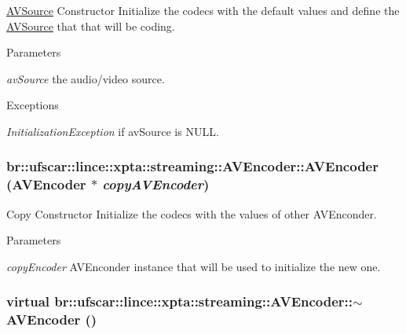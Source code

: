 \hyperlink{classbr_1_1ufscar_1_1lince_1_1xpta_1_1streaming_1_1AVSource}{AVSource} Constructor Initialize the codecs with the default values and define the \hyperlink{classbr_1_1ufscar_1_1lince_1_1xpta_1_1streaming_1_1AVSource}{AVSource} that that will be coding. 


\begin{DoxyParams}{Parameters}
\item[{\em avSource}]the audio/video source. \end{DoxyParams}

\begin{DoxyExceptions}{Exceptions}
\item[{\em InitializationException}]if avSource is NULL. \end{DoxyExceptions}
\hypertarget{classbr_1_1ufscar_1_1lince_1_1xpta_1_1streaming_1_1AVEncoder_a7d4521d46902758f1354421233c45678}{
\subsubsection[{AVEncoder}]{\setlength{\rightskip}{0pt plus 5cm}br::ufscar::lince::xpta::streaming::AVEncoder::AVEncoder ({\bf AVEncoder} $\ast$ {\em copyAVEncoder})}}
\label{classbr_1_1ufscar_1_1lince_1_1xpta_1_1streaming_1_1AVEncoder_a7d4521d46902758f1354421233c45678}


Copy Constructor Initialize the codecs with the values of other AVEnconder. 


\begin{DoxyParams}{Parameters}
\item[{\em copyEncoder}]AVEnconder instance that will be used to initialize the new one. \end{DoxyParams}
\hypertarget{classbr_1_1ufscar_1_1lince_1_1xpta_1_1streaming_1_1AVEncoder_a52c01ec40955a064cfdcb053080d7388}{
\subsubsection[{$\sim$AVEncoder}]{\setlength{\rightskip}{0pt plus 5cm}virtual br::ufscar::lince::xpta::streaming::AVEncoder::$\sim$AVEncoder ()}}
\label{classbr_1_1ufscar_1_1lince_1_1xpta_1_1streaming_1_1AVEncoder_a52c01ec40955a064cfdcb053080d7388}


